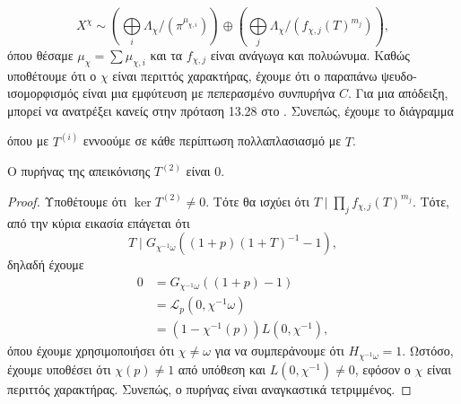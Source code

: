 $$X^\chi \sim \left(\bigoplus\limits_i \Lambda_\chi / (\pi^{\mu_{\chi,i}})\right) \oplus \left( \bigoplus\limits_j 
\Lambda_\chi/(f_{\chi,j}(T)^{m_j})\right),$$ όπου 
θέσαμε $\mu_\chi = \sum \mu_{\chi,i}$ και τα $f_{\chi,j}$ είναι ανάγωγα και  πολυώνυμα. Καθώς υποθέτουμε ότι 
ο $\chi$ είναι περιττός χαρακτήρας, έχουμε ότι ο παραπάνω ψευδο-ισομορφισμός είναι μια εμφύτευση με πεπερασμένο συνπυρήνα $C$. 
Για μια απόδειξη, μπορεί να ανατρέξει κανείς στην πρόταση 13.28 στο \cite{Wash}. Συνεπώς, έχουμε το διάγραμμα

\begin{figure}[H]
    \centering
\end{figure} 
\noindent όπου με $T^{(i)}$ εννοούμε σε κάθε περίπτωση πολλαπλασιασμό με $T$.

\begin{lemma} Ο πυρήνας της απεικόνισης $T^{(2)}$ είναι $0$.
\end{lemma}

\begin{proof} Υποθέτουμε ότι $\ker T^{(2)} \neq 0$. Τότε θα ισχύει ότι $T \mid \prod_j f_{\chi,j}(T)^{m_j}$. Τότε, από την κύρια εικασία επάγεται ότι 
    $$T \mid G_{\chi^{-1}\omega}((1+p)(1+T)^{-1}-1),$$ δηλαδή έχουμε 
    \begin{align*}
        0 &= G_{\chi^{-1}\omega}((1+p)-1) \\ 
        &= \mathcal{L}_p(0,\chi^{-1}\omega) \\
        &= (1-\chi^{-1}(p))L(0,\chi^{-1}),
    \end{align*} όπου έχουμε χρησιμοποιήσει ότι $\chi \neq \omega$ για να συμπεράνουμε ότι $H_{\chi^{-1}\omega}=1$. Ωστόσο, έχουμε υποθέσει ότι $\chi(p)\neq 1$ από υπόθεση και $L(0,\chi^{-1}) \neq 0$, εφόσον ο $\chi$ είναι περιττός χαρακτήρας. Συνεπώς, ο πυρήνας είναι αναγκαστικά τετριμμένος.
\end{proof}

